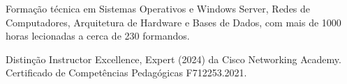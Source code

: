 
\begin{itens}
  \item Formação técnica em Sistemas Operativos e Windows Server, Redes de Computadores, Arquitetura de Hardware e Bases de Dados, com mais de 1000 horas lecionadas a cerca de 230 formandos.
  \item Distinção Instructor Excellence, Expert (2024) da Cisco Networking Academy. Certificado de Competências Pedagógicas F712253.2021.
\end{itens}
